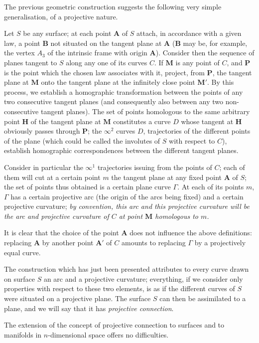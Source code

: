 The previous geometric construction suggests the following very simple generalisation, of a projective nature. 

Let $S$ be any surface; at each point $\bm A$ of $S$ attach, in accordance with a given law, a point $\bm B$ not situated on the tangent plane at $\bm A$ ($\bm B$ may be, for example, the vertex $A_3$ of the intrinsic frame with origin $\bm A$). Consider then the sequence of planes tangent to $S$ along any one of its curves $C$. If $\bm M$ is any point of $C$, and $\bm P$ is the point which the chosen law associates with it, project, from $\bm P$, the tangent plane at $\bm M$ onto the tangent plane at the infinitely close point $\bm M'$. By this process, we establish a homographic transformation between the points of any two consecutive tangent planes (and consequently also between any two non-consecutive tangent planes). The set of points homologous to the same arbitrary point $\bm H$ of the tangent plane at $\bm M$ constitutes a curve $D$ whose tangent at $\bm H$ obviously passes through $\bm P$; the $\infty^2$ curves $D$, trajectories of the different points of the plane (which could be called the involutes of $S$ with respect to $C$), establish homographic correspondences between the different tangent planes.

Consider in particular the $\infty^1$ trajectories issuing from the points of $C$; each of them will cut at a certain point $m$ the tangent plane at any fixed point $\bm A$ of $S$; the set of points thus obtained is a certain plane curve $\Gamma$. At each of its points $m$, $\Gamma$ has a certain projective arc (the origin of the arcs being fixed) and a certain projective curvature; {\em by convention, this arc and this projective curvature will be the arc and projective curvature of $C$ at point $\bm M$ homologous to $m$.}

It is clear that the choice of the point $\bm A$ does not influence the above definitions: replacing $\bm A$ by another point $\bm A'$ of $C$ amounts to  replacing $\Gamma$ by a projectively equal curve.

The construction which has just been presented  attributes to every curve drawn on surface $S$ an arc and a projective curvature; everything, if we consider only properties with respect to these two elements, is as if the different curves of $S$ were situated on a projective plane. The surface $S$ can then be assimilated to a plane, and we will say that it has {\em projective connection}.

The extension of the concept of projective connection to surfaces and to manifolds in $n$-dimensional space offers no difficulties.












